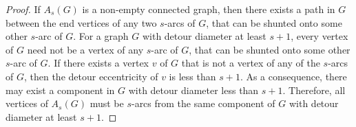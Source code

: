 \documentclass[12pt,a4paper,twoside]{article}
\theoremstyle{casesty}
\theoremstyle{subcasesty}
\theoremstyle{schemesty}
\begin{document}
\begin{proof}
	
	If $A_{s}(G)$ is a non-empty connected graph, then there exists a path in $G$ between the end vertices of any two $s$-arcs of $G$, that can be shunted onto some other $s$-arc of $G$. For a graph $G$ with detour diameter at least $s+1$, every vertex of $G$ need not be a vertex of any $s$-arc of $G$, that can be shunted onto some other $s$-arc of $G$. If there exists a vertex $v$ of $G$ that is not a vertex of any of the $s$-arcs of $G$, then the detour eccentricity of $v$ is less than $s+1$. As a consequence, there may exist a component in $G$ with detour diameter less than $s+1$. %
	Therefore, all vertices of $A_{s}(G)$ must be $s$-arcs from the same component of $G$ with detour diameter at least $s+1$.
\end{proof}
\end{document}
